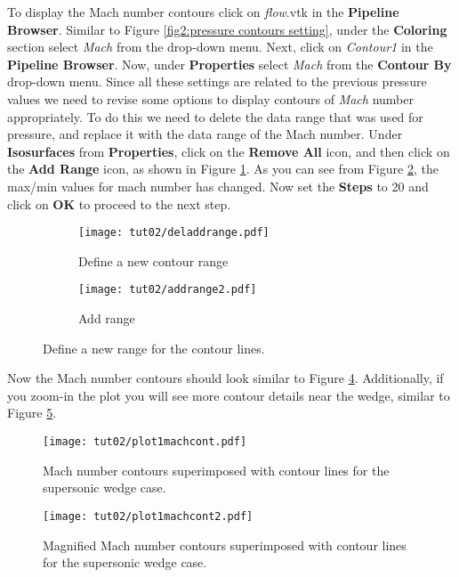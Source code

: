 To display the Mach number contours click on \textit{flow}.vtk in the \textbf{Pipeline Browser}. Similar to Figure \ref{fig2:pressure contours setting}, under the \textbf{Coloring} section select \textit{Mach} from the drop-down menu. Next, click on \textit{Contour1} in the \textbf{Pipeline Browser}. Now, under \textbf{Properties} select \textit{Mach} from the \textbf{Contour By} drop-down menu. Since all these settings are related to the previous pressure values we need to revise some options to display contours of \textit{Mach} number appropriately. To do this we need to delete the data range that was used for pressure, and replace it with the data range of the Mach number. Under \textbf{Isosurfaces} from \textbf{Properties}, click on the \textbf{Remove All} icon, and then click on the \textbf{Add Range} icon, as shown in Figure \ref{fig2:contourby2 a}. As you can see from Figure \ref{fig2:contourby2 b}, the max/min values for mach number has changed. Now set the \textbf{Steps} to 20 and click on \textbf{OK} to proceed to the next step.
\begin{figure}[htbp]
    \centering
     \begin{subfigure}[b]{.4\textwidth}
         \centering
         \texttt{[image: tut02/deladdrange.pdf]}
         \caption{Define a new contour range}
         \label{fig2:contourby2 a}
     \end{subfigure}
     \hfill
     \begin{subfigure}[b]{.4\textwidth}
         \centering
         \texttt{[image: tut02/addrange2.pdf]}
         \caption{Add range}
         \label{fig2:contourby2 b}
     \end{subfigure}     
    \caption{Define a new range for the contour lines.}
    \label{fig2:contourby2}
\end{figure}
Now the Mach number contours should look similar to Figure \ref{fig2:mach_contour}. Additionally, if you zoom-in the plot you will see more contour details near the wedge, similar to Figure \ref{fig2:mach_contour_zoom}.
\begin{figure}[htbp]
    \centering
    \texttt{[image: tut02/plot1machcont.pdf]}
    \caption{Mach number contours superimposed with contour lines for the supersonic wedge case.}
    \label{fig2:mach_contour}
\end{figure}
\begin{figure}[htbp]
    \centering
    \texttt{[image: tut02/plot1machcont2.pdf]}
    \caption{Magnified Mach number contours superimposed with contour lines for the supersonic wedge case.}
    \label{fig2:mach_contour_zoom}
\end{figure}
